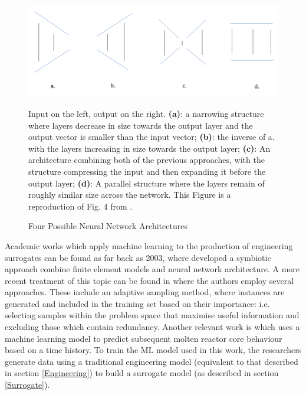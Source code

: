 \begin{figure}[p]
	\centering
	\includegraphics[scale=0.5]{Figures/architecture.png}
	\caption{Four Possible Neural Network Architectures} {Input on the left, output on the right. \textbf{(a)}: a narrowing structure where layers decrease in size towards the output layer and the output vector is smaller than the input vector; \textbf{(b)}: the inverse of a. with the layers increasing in size towards the output layer; \textbf{(c)}: An architecture combining both of the previous approaches, with the structure compressing the input and then expanding it before the output layer; \textbf{(d)}: A parallel structure where the layers remain of roughly similar size across the network. This Figure is a reproduction of Fig. 4 from \cite{fernandez2017nuclear}.}
	\label{fig:architectures}
\end{figure}

\noindent
Academic works which apply machine learning to the production of engineering surrogates can be found as far back as 2003, where \cite{javadi2003neural} developed a symbiotic approach combine finite element models and neural network architecture. A more recent treatment of this topic can be found in \cite{kim2019machine} where the authors employ several approaches. These include an adaptive sampling method, where instances are generated and included in the training set based on their importance: i.e. selecting samples within the problem space that maximise useful information and excluding those which contain redundancy. Another relevant work is \cite{zeng2018machine} which uses a machine learning model to predict subsequent molten reactor core behaviour based on a time history. To train the ML model used in this work, the researchers generate data using a traditional engineering model (equivalent to that described in section \ref{Engineering}) to build a surrogate model (as described in section \ref{Surrogate}).  
\\

